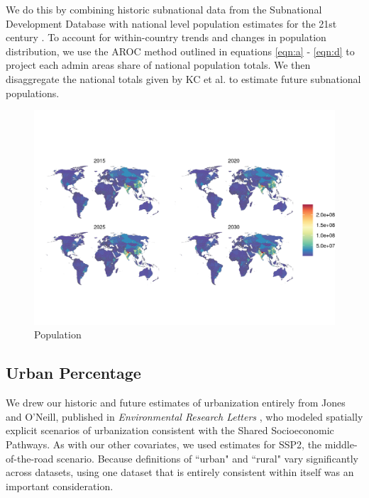 \documentclass{article}
\begin{document}
We do this by combining historic subnational data from the Subnational Development Database \citep{Smits2019} with national level population estimates for the 21st century \citep{KC2017}.  To account for within-country trends and changes in population distribution, we use the AROC method outlined in equations \ref{eqn:a} - \ref{eqn:d} to project each admin areas share of national population totals. We then disaggregate the national totals given by KC et al. to estimate future subnational populations.

\begin{figure}[H]
  \centering
  \includegraphics[width=\linewidth]{img/covars/population.png}
  \caption{Population}
\end{figure}

\subsection{Urban Percentage}

We drew our historic and future estimates of urbanization entirely from Jones and O'Neill, published in \textit{Environmental Research Letters} \citep{Jones2016}, who modeled spatially explicit scenarios of urbanization consistent with the Shared Socioeconomic Pathways.  As with our other covariates, we used estimates for SSP2, the middle-of-the-road scenario.  Because definitions of ``urban" and ``rural" vary significantly across datasets, using one dataset that is entirely consistent within itself was an important consideration.
\end{document}

